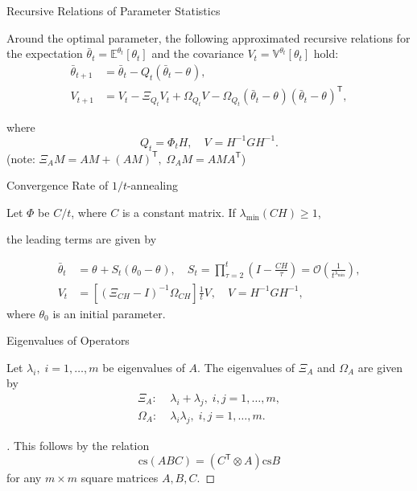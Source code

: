 \documentclass[fleqn,aspectratio=1610]{beamer}
\begin{document}
\begin{frame}[label={sec:orgd94bfe5}]{Recursive Relations of Parameter Statistics}
\begin{lemma}[]\label{sec:org1daed68}
Around the optimal parameter,
the following approximated recursive relations for
the expectation \(\bar\theta_{t}=\mathbb{E}^{\theta_{t}}\left[\theta_{t}\right]\)
and the covariance \(V_{t}=\mathbb{V}^{\theta_{t}}\left[\theta_{t}\right]\)
hold:
\begin{align}
  \bar{\theta}_{t+1}
  &=\bar{\theta}_{t}
    -Q_{t}(\bar{\theta}_{t}-\theta_{}),\\
  V_{t+1}
  &=V_{t}
    -\Xi_{Q_{t}}V_{t}
    +\Omega_{Q_{t}}V_{}
    -\Omega_{Q_{t}}(\bar{\theta}_{t}-\theta_{}) 
    (\bar{\theta}_{t}-\theta_{})^{\mathsf{T}},
\end{align}

where
\begin{equation}
  Q_{t}=\varPhi_{t}H,\quad
  V_{}=H^{-1}GH^{-1}.
\end{equation}
(note: \(\Xi_{A}M= AM+(AM)^{\mathsf{T}},\;\Omega_{A}M= AMA^{\mathsf{T}}\))
\end{lemma}
\end{frame}

\begin{frame}[label={sec:org537e1be}]{Convergence Rate of \(1/t\)-annealing}
\begin{theorem}[]\label{sec:org1a60e5b}
Let \(\varPhi\) be \(C/t\), where \(C\) is a constant matrix.
If \(\lambda_{\min}(CH)\geq 1\), 

the leading terms are given by

\begin{align}
  \bar\theta_{t}
  &=\theta_{}+S_{t}(\theta_{0}-\theta_{}),
    \quad
    S_{t}
    =\prod_{\tau=2}^{t}\left(I-\frac{CH}{\tau}\right)
    =\mathcal{O}\left(\frac{1}{t^{\lambda_{\min}}}\right),\\
  V_{t}
  &=\left[\left(\Xi_{CH}-I\right)^{-1}\Omega_{CH}\right]\frac{1}{t}V_{},
    \quad V_{}=H^{-1}GH^{-1},
\end{align}
where \(\theta_{0}\) is an initial parameter.
\end{theorem}
\end{frame}

\begin{frame}[label={sec:orgb01f861}]{Eigenvalues of Operators}
\begin{lemma}[]\label{sec:org839b71f}
Let \(\lambda_{i},\;i=1,\dotsc,m\) be eigenvalues of \(A\).
The eigenvalues of \(\Xi_{A}\) and \(\Omega_{A}\) are given by
\begin{align}
  \Xi_{A}:\;&\lambda_{i}+\lambda_{j},\;i,j=1,\dotsc,m,\\
  \Omega_{A}:\;&\lambda_{i}\lambda_{j},\;i,j=1,\dotsc,m.
\end{align}
\end{lemma}
\begin{proof}[]
This follows by the relation
\begin{equation}
  \mathrm{cs}(ABC)=(C^{\mathsf{T}}\otimes A)\mathrm{cs} B
\end{equation}
for any \(m\times m\) square matrices \(A,B,C\).
\end{proof}
\end{frame}
\end{document}
